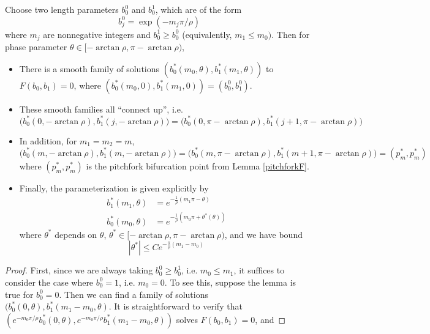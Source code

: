 \documentclass[thesis.tex]{subfiles}
\begin{document}
\begin{lemma}\label{thetaparam}
Choose two length parameters $b_0^0$ and $b_0^1$, which are of the form 
\begin{equation}\label{bj0form}
b_j^0 = \exp(-m_j \pi / \rho )
\end{equation}
where $m_j$ are nonnegative integers and $b_0^1 \geq b_0^0$ (equivalently, $m_1 \leq m_0)$. Then for phase parameter $\theta \in [-\arctan \rho,\pi - \arctan \rho)$, 

\begin{itemize}
\item There is a smooth family of solutions $( b_0^*(m_0, \theta), b_1^*(m_1, \theta) )$ to $F(b_0, b_1) = 0$, where $(b_0^*(m_0, 0), b_1^*(m_1, 0)) = (b_0^0, b_1^0)$.\\

\item These smooth families all ``connect up'', i.e.
\[
\Big( b_0^*(0, -\arctan \rho), b_1^*(j, -\arctan \rho) \Big) = \Big( b_0^*(0, \pi - \arctan \rho), b_1^*(j+1, \pi - \arctan \rho) \Big)
\]

\item In addition, for $m_1 = m_2 = m$, 
\[
\Big( b_0^*(m, -\arctan \rho), b_1^*(m, -\arctan \rho) \Big) = \Big( b_0^*(m, \pi - \arctan \rho), b_1^*(m+1, \pi - \arctan \rho) \Big) = (p^*_m, p^*_m)
\] 
where $(p^*_m, p^*_m)$ is the pitchfork bifurcation point from Lemma \ref{pitchforkF}.

\item Finally, the parameterization is given explicitly by
\begin{align*}
b_1^*(m_1, \theta) &= e^{-\frac{1}{\rho}(m_1 \pi - \theta) } \\
b_0^*(m_0, \theta) &= e^{-\frac{1}{\rho}(m_0 \pi + \theta^*(\theta)) }
\end{align*}
where $\theta^*$ depends on $\theta$, $\theta^* \in [-\arctan \rho,\pi - \arctan \rho)$, and we have bound
\[
|\theta^*| \leq C e^{ -\frac{\pi}{\rho}(m_1 - m_0)}
\]
\end{itemize}

\begin{proof}

First, since we are always taking $b_0^0 \geq b_0^1$, i.e. $m_0 \leq m_1$, it suffices to consider the case where $b_0^0 = 1$, i.e. $m_0 = 0$. To see this, suppose the lemma is true for $b_0^0 = 0$. Then we can find a family of solutions $(b_0^*(0, \theta), b_1^*(m_1 - m_0, \theta)$. It is straightforward to verify that $(e^{-m_0 \pi/\rho} b_0^*(0, \theta), e^{-m_0 \pi/\rho} b_1^*(m_1 - m_0, \theta))$ solves $F(b_0, b_1) = 0$, and 


\end{proof}
\end{lemma}
\end{document}

